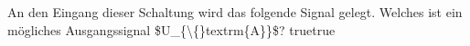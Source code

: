     {An den Eingang dieser Schaltung wird das folgende Signal gelegt. Welches ist ein mögliches Ausgangssignal \$U\_\{\textbackslash\{\}textrm\{A\}\}\$?}
    {}
    {}
    {}
    {}
    {true}{true}
